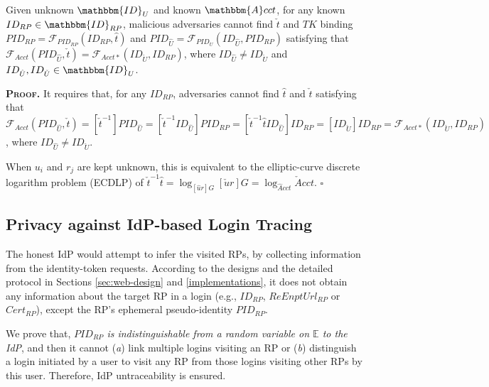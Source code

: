 \vspace{1.5mm}
\begin{thm} Given unknown $\mathbbm{ID}_U$ and known $\mathbbm{A}cct$,
for any known $ID_{RP} \in \mathbbm{ID}_{RP}$, 
     malicious adversaries cannot find $\check{t}$ and $TK$ binding $PID_{RP} = \mathcal{F}_{PID_{RP}}(ID_{RP}, \hat{t})$
     and $PID_{\hat{U}}=\mathcal{F}_{PID_U}(ID_{\hat{U}}, PID_{RP})$ satisfying that $\mathcal{F}_{Acct}(PID_{\hat{U}}, \check{t}) = \mathcal{F}_{Acct\ast}(ID_{\check{U}}, ID_{RP})$, where $ID_{\hat{U}} \neq ID_{\check{U}}$ and $ID_{\hat{U}},ID_{\check{U}} \in \mathbbm{ID}_U$.
\label{thm-u-id}
\end{thm}

\noindent\textbf{\textsc{Proof.}}
It requires that, for any $ID_{RP}$, adversaries cannot find $\hat{t}$ and $\check{t}$ satisfying that $\mathcal{F}_{Acct}(PID_{\hat{U}}, \check{t}) = [\check{t}^{-1}]PID_{\hat{U}} = [\check{t}^{-1}ID_{\hat{U}}]PID_{RP}
= [\check{t}^{-1}\hat{t}ID_{\hat{U}}]ID_{RP}
    = [ID_{\check{U}}]ID_{RP} = \mathcal{F}_{Acct\ast}(ID_{\check{U}}, ID_{RP})$,
where $ID_{\hat{U}} \neq ID_{\check{U}}$.

When $u_{i}$ and $r_{j}$ are kept unknown, this is equivalent to the elliptic-curve discrete logarithm problem (ECDLP) of $\check{t}^{-1}\hat{t} = \log_{[\hat{u}r]G}{[\check{u}r]G} = \log_{\hat{A}cct}{\check{A}cct}$.
\hfill $\square$

\subsection{Privacy against IdP-based Login Tracing}
\label{subsec:IdP-privacy}

The honest IdP would attempt to infer the visited RPs,
by collecting information from the identity-token requests.
According to the designs and the detailed protocol in Sections \ref{sec:web-design} and \ref{implementations},
 it does not obtain any information about the target RP in a login (e.g., $ID_{RP}$, $ReEnptUrl_{RP}$ or $Cert_{RP}$), except the RP's ephemeral pseudo-identity $PID_{RP}$.

We prove that, \emph{$PID_{RP}$ is indistinguishable from a random variable on $\mathbb{E}$ to the IdP},
    and then
 it cannot (\emph{a}) link multiple logins visiting an RP or (\emph{b}) distinguish a login initiated by a user to visit any RP from those logins visiting other RPs by this user. %
Therefore, IdP untraceability is ensured.


